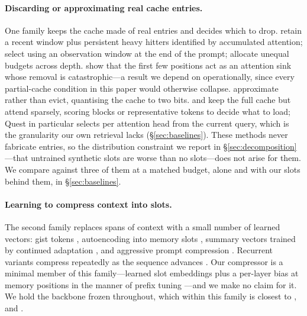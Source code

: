 \documentclass[11pt]{article}
\begin{document}
\paragraph{Discarding or approximating real cache entries.}
One family keeps the cache made of real entries and decides which to drop.
\citet{h2o} retain a recent window plus persistent heavy hitters identified by
accumulated attention; \citet{snapkv} select using an observation window at the
end of the prompt; \citet{pyramidkv} allocate unequal budgets across depth.
\citet{streamingllm} show that the first few positions act as an attention sink
whose removal is catastrophic---a result we depend on operationally, since every
partial-cache condition in this paper would otherwise collapse.
\citet{kivi} approximate rather than evict, quantising the cache to two bits.
\citet{quest} and \citet{infllm} keep the full cache but attend sparsely, scoring
blocks or representative tokens to decide what to load; Quest in particular
selects per attention head from the current query, which is the granularity our
own retrieval lacks (\S\ref{sec:baselines}). These methods never fabricate
entries, so the distribution constraint we report in
\S\ref{sec:decomposition}---that untrained synthetic slots are worse than no
slots---does not arise for them. We compare against three of them at a matched
budget, alone and with our slots behind them, in \S\ref{sec:baselines}.

\paragraph{Learning to compress context into slots.}
The second family replaces spans of context with a small number of learned
vectors: gist tokens \citep{gist}, autoencoding into memory slots \citep{icae},
summary vectors trained by continued adaptation \citep{autocompressor}, and
aggressive prompt compression \citep{500x}. Recurrent variants compress
repeatedly as the sequence advances \citep{compressive,rmt,lcirc}. Our compressor
is a minimal member of this family---learned slot embeddings plus a per-layer
bias at memory positions in the manner of prefix tuning \citep{ptuningv2}---and we
make no claim for it. We hold the backbone frozen throughout, which within this
family is closest to \citet{icae}, \citet{arcencoder} and \citet{500x}.
\end{document}
